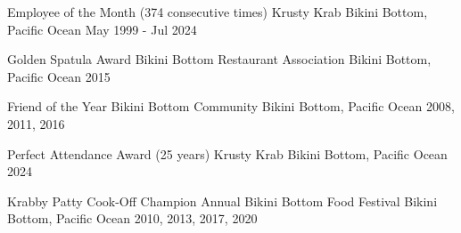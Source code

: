 \begin{cvhonors}

  \cvhonor
    {Employee of the Month (374 consecutive times)} %
    {Krusty Krab} %
    {Bikini Bottom, Pacific Ocean} %
    {May 1999 - Jul 2024} %

  \cvhonor
    {Golden Spatula Award} %
    {Bikini Bottom Restaurant Association} %
    {Bikini Bottom, Pacific Ocean} %
    {2015} %

  \cvhonor
    {Friend of the Year} %
    {Bikini Bottom Community} %
    {Bikini Bottom, Pacific Ocean} %
    {2008, 2011, 2016} %

  \cvhonor
    {Perfect Attendance Award (25 years)} %
    {Krusty Krab} %
    {Bikini Bottom, Pacific Ocean} %
    {2024} %

  \cvhonor
    {Krabby Patty Cook-Off Champion} %
    {Annual Bikini Bottom Food Festival} %
    {Bikini Bottom, Pacific Ocean} %
    {2010, 2013, 2017, 2020} %

\end{cvhonors}
